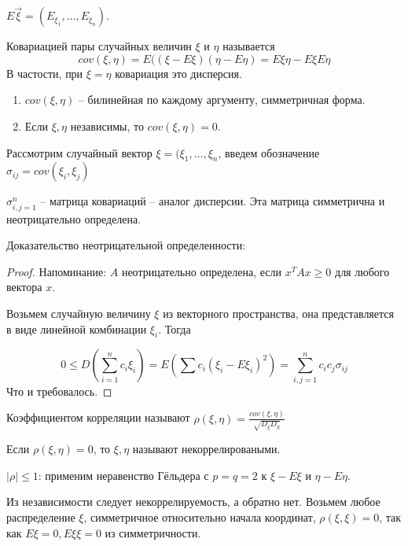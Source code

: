 \begin{Def}
    $E{\vec{\xi}} = (E_{\xi_1}, \dots, E_{\xi_n})$.
\end{Def}
\begin{Def}
    Ковариацией пары случайных величин $\xi$ и $\eta$ называется $$cov(\xi, \eta) = E((\xi - E\xi)(\eta - E\eta) = E\xi\eta - E\xi E\eta$$ 
    В частости, при $\xi = \eta$ ковариация это дисперсия.
\end{Def}

\begin{theorem}
\begin{enumerate}
    \item $cov(\xi, \eta)$ -- билинейная по каждому аргументу, симметричная форма.
    \item Если $\xi, \eta$ независимы, то $cov(\xi, \eta) = 0$.
\end{enumerate}
\end{theorem}

\begin{Def}
    Рассмотрим случайный вектор $\xi = (\xi_1, \dots, \xi_n$, введем обозначение $\sigma_{ij} = cov(\xi_i, \xi_j)$

    $\sigma_{i,j=1}^n$ -- матрица ковариаций -- аналог дисперсии. Эта матрица симметрична и неотрицательно определена.
\end{Def}
Доказательство неотрицательной определенности:
\begin{proof}
Напоминание: $A$ неотрицательно определена, если $x^TAx \geq 0$ для любого вектора $x$. 

Возьмем случайную величину $\xi$ из векторного пространства, она представляется в виде линейной комбинации $\xi_i$. Тогда

$$0 \leq D(\sum\limits_{i = 1}^n c_i \xi_i) = E(\sum c_i (\xi_i - E \xi_i)^2) = \sum\limits_{i,j=1}^n c_i c_j \sigma_{ij}$$
Что и требовалось.
\end{proof}

\begin{Def}
    Коэффициентом корреляции называют $\rho(\xi, \eta) = \frac{cov(\xi, \eta)}{\sqrt{D_\xi D_\eta}}$
    
    Если $\rho(\xi, \eta) = 0$, то $\xi, \eta$ называют некоррелироваными.
\end{Def}
\begin{Rem}
    $|\rho| \leq 1$: применим неравенство Гёльдера с $p=q=2$ к $\xi - E\xi$ и $\eta - E\eta$.
\end{Rem}

\begin{Rem}
Из независимости следует некоррелируемость, а обратно нет.
Возьмем любое распределение $\xi$, симметричное относительно начала координат, $\rho(\xi, \xi) = 0$, так как $E\xi = 0, E \xi \xi = 0$ из симметричности.
\end{Rem}

